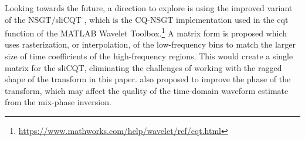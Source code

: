 \documentclass[report.tex]{subfiles}
\begin{document}
Looking towards the future, a direction to explore is using the improved variant of the NSGT/sliCQT \parencite{variableq1}, which is the CQ-NSGT implementation used in the cqt function of the MATLAB Wavelet Toolbox.\footnote{\url{https://www.mathworks.com/help/wavelet/ref/cqt.html}} A matrix form is proposed which uses rasterization, or interpolation, of the low-frequency bins to match the larger size of time coefficients of the high-frequency regions. This would create a single matrix for the sliCQT, eliminating the challenges of working with the ragged shape of the transform in this paper. \textcite{variableq1} also proposed to improve the phase of the transform, which may affect the quality of the time-domain waveform estimate from the mix-phase inversion.
\end{document}

